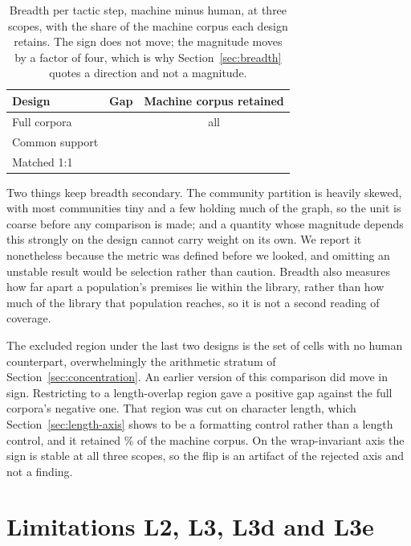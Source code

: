 \begin{table}[h]
\centering
\caption{Breadth per tactic step, machine minus human, at three scopes, with
the share of the machine corpus each design retains. The sign does not move;
the magnitude moves by a factor of four, which is why
Section~\ref{sec:breadth} quotes a direction and not a magnitude.}
\label{tab:breadth}
\small
\begin{tabular}{lcc}
\toprule
Design & Gap & Machine corpus retained \\
\midrule
Full corpora   & \breadthGapFull{}    & all \\
Common support & \breadthGapSupport{} & \supportRetentionMachine{} \\
Matched 1:1    & \breadthGapMatched{} & \supportRetentionMachine{} \\
\bottomrule
\end{tabular}
\end{table}

Two things keep breadth secondary. The community partition is heavily skewed,
with most communities tiny and a few holding much of the graph, so the unit is
coarse before any comparison is made; and a quantity whose magnitude depends this strongly on the
design cannot carry weight on its own. We report it nonetheless because the
metric was defined before we looked, and omitting an unstable result would be
selection rather than caution. Breadth also measures how far apart a
population's premises lie within the library, rather than how much of the
library that population reaches, so it is not a second reading of coverage.

The excluded region under the last two designs is the set of cells with no
human counterpart, overwhelmingly the arithmetic stratum of
Section~\ref{sec:concentration}. An earlier version of this comparison did
move in sign. Restricting to a length-overlap region gave a positive gap
against the full corpora's negative one. That region was cut on character
length, which
Section~\ref{sec:length-axis} shows to be a formatting control rather than a
length control, and it retained \charOverlapMachineRetainedPct{}\% of the
machine corpus. On the wrap-invariant axis the sign is stable at all three
scopes, so the flip is an artifact of the rejected axis and not a finding.

\section{Limitations L2, L3, L3d and L3e}
\label{app:limitations}


